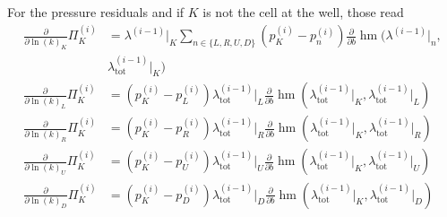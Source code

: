 \documentclass[twoside]{IEEEtran}
\newcommand*{\pdiff}[2]{\ensuremath{\frac{\partial}{\partial{#2}}{#1}}}
\DeclareMathOperator*{\hmean}{hm}
\begin{document}
For the pressure residuals and if $K$ is not the cell at the well, those read\\
\begin{align}
\pdiff{\Pi_K^{(i)}}{\ln(k)_K} &= \lambda^{(i-1)}\lvert_K\sum_{n\in\{L, R, U, D\}} (p_K^{(i)} - p_n^{(i)})\pdiff{\hmean}{b}(\lambda^{(i-1)}\lvert_n,\\& \lambda_\text{tot}^{(i-1)}\lvert_K)\nonumber\\
\pdiff{\Pi_K^{(i)}}{\ln(k)_L} &= (p_K^{(i)} - p_L^{(i)})\lambda_\text{tot}^{(i-1)}\lvert_L \pdiff{\hmean}{b}(\lambda_\text{tot}^{(i-1)}\lvert_K, \lambda_\text{tot}^{(i-1)}\lvert_L) \\
\pdiff{\Pi_K^{(i)}}{\ln(k)_R} &= (p_K^{(i)} - p_R^{(i)})\lambda_\text{tot}^{(i-1)}\lvert_R \pdiff{\hmean}{b}(\lambda_\text{tot}^{(i-1)}\lvert_K, \lambda_\text{tot}^{(i-1)}\lvert_R) \\
\pdiff{\Pi_K^{(i)}}{\ln(k)_U} &= (p_K^{(i)} - p_U^{(i)})\lambda_\text{tot}^{(i-1)}\lvert_U \pdiff{\hmean}{b}(\lambda_\text{tot}^{(i-1)}\lvert_K, \lambda_\text{tot}^{(i-1)}\lvert_U) \\
\pdiff{\Pi_K^{(i)}}{\ln(k)_D} &= (p_K^{(i)} - p_D^{(i)})\lambda_\text{tot}^{(i-1)}\lvert_D \pdiff{\hmean}{b}(\lambda_\text{tot}^{(i-1)}\lvert_K, \lambda_\text{tot}^{(i-1)}\lvert_D)
\end{align}
\end{document}
